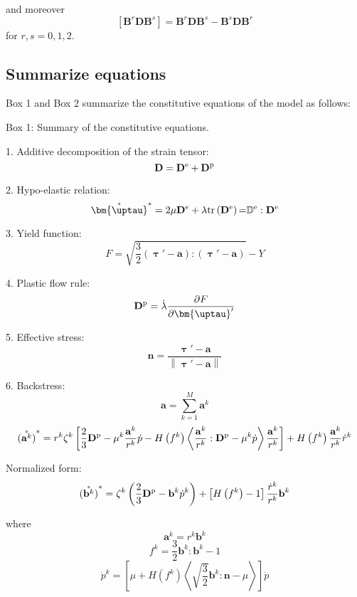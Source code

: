 and moreover
\begin{equation}
\left[ {{{\mathbf{B}}^r}{\mathbf{D}}{{\mathbf{B}}^s}} \right] = {{\mathbf{B}}^r}{\mathbf{D}}{{\mathbf{B}}^s} - {{\mathbf{B}}^s}{\mathbf{D}}{{\mathbf{B}}^r}
\end{equation}
for $r,s = 0,1,2$.

\subsection{Summarize equations}
\noindent
Box 1 and Box 2 summarize the constitutive equations of the model as follows:
\begin{framed}
\label{Box:1}
Box 1: Summary of the constitutive equations.

1. Additive decomposition of the strain tensor:
\[{\mathbf{D}} = {{\mathbf{D}}^{\rm{e}}} + {{\mathbf{D}}^{\rm{p}}}\]

2. Hypo-elastic relation:
\[{\mathring {\bm{\uptau }}^{*}} = 2\mu {{\mathbf{D}}^{\rm{e}}} + \lambda {\rm{tr}}\left( {{{\mathbf{D}}^{\rm{e}}}} \right){\rm{ = }}{\mathbb{D}^{\rm{e}}}:{{\mathbf{D}}^{\rm{e}}}\]

3. Yield function:
\[F = \sqrt {\frac{3}{2}\left( {{\bm{\uptau}}' - {\mathbf{a}}} \right):\left( {{\bm{\uptau}}' - {\mathbf{a}}} \right)}  - Y\]

4. Plastic flow rule:
\[{{{\mathbf{D}}^{\rm{p}}}} = \dot \lambda \frac{{\partial F}}{{\partial {\bm{\uptau }'}}}\]

5. Effective stress:
\[{\mathbf{n}} = \frac{{{\bm{\uptau}}' - {\mathbf{a}}}}{{\left\| {{\bm{\uptau}}' - {\mathbf{a}}} \right\|}}\]

6. Backstress:
\[{\mathbf{a}} = \sum\limits_{k = 1}^M {{{\mathbf{a}}^k}} \]
\[\mathring{\left({\mathbf{a}}^{k}\right)}^* = {r^k}{\zeta ^k}\left[ {\frac{2}{3}{{\mathbf{D}}^{\rm{p}}} - {\mu ^k}\frac{{{{\mathbf{a}}^k}}}{{{r^k}}}\dot p - H\left( {{f^k}} \right)\left\langle {\frac{{{{\mathbf{a}}^k}}}{{{r^k}}}:{{\mathbf{D}}^{\rm{p}}} - {\mu ^k}\dot p} \right\rangle \frac{{{{\mathbf{a}}^k}}}{{{r^k}}}} \right] + H\left( {{f^k}} \right)\frac{{{{\mathbf{a}}^k}}}{{{r^k}}}{\dot r^k}\]

Normalized form:
\[\mathring{\left({\mathbf{b}}^{k}\right)}^* = {\zeta ^k}\left( {\frac{2}{3}{{\mathbf{D}}^{\rm{p}}} - {{\mathbf{b}}^k}{{\dot p}^k}} \right) + \left[ {H\left( {{f^k}} \right) - 1} \right]\frac{{{{\dot r}^k}}}{{{r^k}}}{{\mathbf{b}}^k}\]

where
\[{{\mathbf{a}}^k} = {r^k}{{\mathbf{b}}^k}\]
\[{f^k} = \frac{3}{2}{{\mathbf{b}}^k}:{{\mathbf{b}}^k} - 1\]
\[{\dot p^k} = \left[ {\mu  + H\left( {{f^k}} \right)\left\langle {\sqrt {\frac{3}{2}} {{\mathbf{b}}^k}:{\mathbf{n}} - \mu } \right\rangle } \right]\dot p\]
\end{framed}


